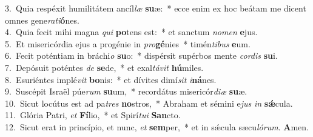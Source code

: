 {3.~}Quia respéxit humilitátem ancíl\textit{læ} \textbf{su}æ:~* ecce enim ex hoc beátam me dicent omnes gene\textit{ra}\textit{ti}\textbf{ó}nes.\\
{4.~}Quia fecit mihi magna \textit{qui} \textbf{po}tens est:~* et sanctum \textit{no}\textit{men} \textbf{e}jus.\\
{5.~}Et misericórdia ejus a progénie in \textit{pro}\textbf{gé}nies~* timén\textit{ti}\textit{bus} \textbf{e}um.\\
{6.~}Fecit poténtiam in bráchi\textit{o} \textbf{su}o:~* dispérsit supérbos mente \textit{cor}\textit{dis} \textbf{su}i.\\
{7.~}Depósuit poténtes \textit{de} \textbf{se}de,~* et exal\textit{tá}\textit{vit} \textbf{hú}miles.\\
{8.~}Esuriéntes implé\textit{vit} \textbf{bo}nis:~* et dívites dimí\textit{sit} \textit{i}\textbf{ná}nes.\\
{9.~}Suscépit Israël púe\textit{rum} \textbf{su}um,~* recordátus misericór\textit{di}\textit{æ} \textbf{su}æ.\\
{10.~}Sicut locútus est ad pa\textit{tres} \textbf{no}stros,~* Abraham et sémini e\textit{jus} \textit{in} \textbf{sǽ}cula.\\
{11.~}Glória Patri, \textit{et} \textbf{Fí}lio,~* et Spirí\textit{tu}\textit{i} \textbf{San}cto.\\
{12.~}Sicut erat in princípio, et nunc, \textit{et} \textbf{sem}per,~* et in sǽcula sæcu\textit{ló}\textit{rum}. \textbf{A}men.\\
